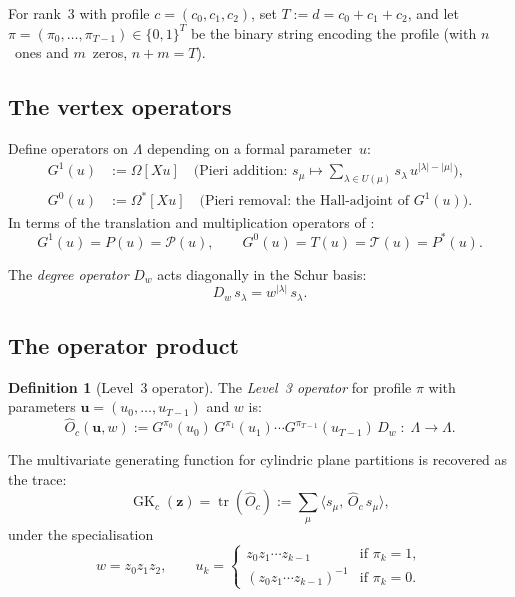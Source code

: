 \documentclass[11pt]{article}
\newcommand{\La}{\Lambda}
\newcommand{\GK}{\operatorname{GK}}
\DeclareMathOperator{\tr}{tr}
\theoremstyle{plain}
\theoremstyle{definition}
\newtheorem{definition}[theorem]{Definition}
\begin{document}
For rank~3 with profile $c = (c_0, c_1, c_2)$, set
$T := d = c_0 + c_1 + c_2$, and let
$\pi = (\pi_0, \ldots, \pi_{T-1}) \in \{0,1\}^T$ be the binary
string encoding the profile (with $n$~ones and $m$~zeros,
$n + m = T$).

\subsection{The vertex operators}

Define operators on $\La$ depending on a formal parameter~$u$:
\begin{align}
  G^1(u) &:= \Omega[Xu]
    \quad\text{(Pieri addition: $s_\mu \mapsto \sum_{\lambda \in
    U(\mu)} s_\lambda\, u^{|\lambda|-|\mu|}$)},
    \label{eq:G1} \\
  G^0(u) &:= \Omega^*[Xu]
    \quad\text{(Pieri removal: the Hall-adjoint of $G^1(u)$)}.
    \label{eq:G0}
\end{align}
In terms of the translation and multiplication operators of
\cite{COMMUTATION}:
\begin{equation}\label{eq:G-PT}
  G^1(u) = P(u) = \mathcal{P}(u), \qquad
  G^0(u) = T(u) = \mathcal{T}(u) = P^*(u).
\end{equation}

The \emph{degree operator} $D_w$ acts diagonally in the Schur basis:
\begin{equation}\label{eq:Dw}
  D_w\, s_\lambda = w^{|\lambda|}\, s_\lambda.
\end{equation}

\subsection{The operator product}

\begin{definition}[Level~3 operator]
\label{def:O-hat}
The \emph{Level~3 operator} for profile $\pi$ with parameters
$\mathbf{u} = (u_0, \ldots, u_{T-1})$ and $w$ is:
\begin{equation}\label{eq:O-hat}
  \hat{O}_c(\mathbf{u}, w)
  := G^{\pi_0}(u_0)\, G^{\pi_1}(u_1) \cdots
     G^{\pi_{T-1}}(u_{T-1})\, D_w
  \;\colon\; \La \to \La.
\end{equation}
\end{definition}

The multivariate generating function for cylindric plane partitions
is recovered as the trace:
\begin{equation}\label{eq:trace}
  \GK_c(\mathbf{z})
  = \tr(\hat{O}_c)
  := \sum_\mu \langle s_\mu,\, \hat{O}_c\, s_\mu \rangle,
\end{equation}
under the specialisation
\begin{equation}\label{eq:specialisation}
  w = z_0 z_1 z_2, \qquad
  u_k = \begin{cases}
    z_0 z_1 \cdots z_{k-1} & \text{if } \pi_k = 1, \\
    (z_0 z_1 \cdots z_{k-1})^{-1} & \text{if } \pi_k = 0.
  \end{cases}
\end{equation}
\end{document}
